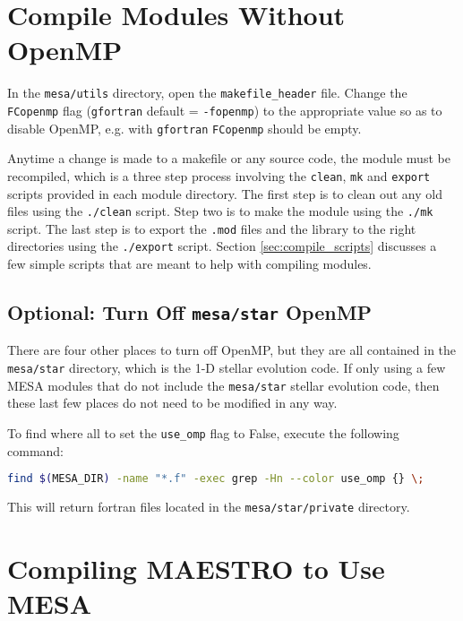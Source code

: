 \section{Compile Modules Without OpenMP}
\label{sec:compile_wo_omp}

In the {\tt mesa/utils} directory, open the {\tt makefile\_header} file. 
Change the {\tt FCopenmp} flag ({\tt gfortran} default = {\tt -fopenmp}) to 
the appropriate value so as to disable OpenMP, e.g. with {\tt gfortran} 
{\tt FCopenmp} should be empty. 

Anytime a change is made to a makefile or any source code, the module must 
be recompiled, which is a three step process involving the {\tt clean}, 
{\tt mk} and {\tt export} scripts provided in each module directory. The 
first step is to clean out any old files using the {\tt ./clean} script. 
Step two is to make the module using the {\tt ./mk} script. The last step is 
to export the {\tt .mod} files and the library to the right directories using 
the {\tt ./export} script. Section \ref{sec:compile_scripts} discusses a few 
simple scripts that are meant to help with compiling modules.

\subsection{Optional: Turn Off {\tt mesa/star} OpenMP}
There are four other places to turn off OpenMP, but they are all contained 
in the {\tt mesa/star} directory, which is the 1-D stellar evolution code. If 
only using a few {\sf MESA} modules that do not include the {\tt mesa/star} 
stellar evolution code, then these last few places do not need to be 
modified in any way. 

To find where all to set the {\tt use\_omp} flag to False, execute the 
following command:
\begin{lstlisting}[language=bash,mathescape=false]
  find $(MESA_DIR) -name "*.f" -exec grep -Hn --color use_omp {} \;
\end{lstlisting}
This will return fortran files located in the {\tt mesa/star/private} 
directory.

\section{Compiling {\sf MAESTRO} to Use {\sf MESA}}

